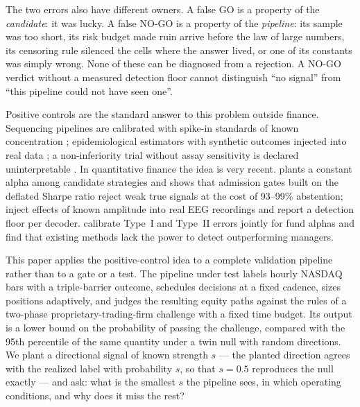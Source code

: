 \documentclass[11pt]{article}
\begin{document}
The two errors also have different owners. A false GO is a property of the \emph{candidate}: it was lucky. A false NO-GO is a property of the \emph{pipeline}: its sample was too short, its risk budget made ruin arrive before the law of large numbers, its censoring rule silenced the cells where the answer lived, or one of its constants was simply wrong. None of these can be diagnosed from a rejection. A NO-GO verdict without a measured detection floor cannot distinguish ``no signal'' from ``this pipeline could not have seen one''.

Positive controls are the standard answer to this problem outside finance. Sequencing pipelines are calibrated with spike-in standards of known concentration \citep{jiang2011}; epidemiological estimators with synthetic outcomes injected into real data \citep{schuemie2018}; a non-inferiority trial without assay sensitivity is declared uninterpretable \citep{temple2000}. In quantitative finance the idea is very recent. \citet{zheng2026} plants a constant alpha among candidate strategies and shows that admission gates built on the deflated Sharpe ratio reject weak true signals at the cost of 93--99\% abstention; \citet{adeika2026} inject effects of known amplitude into real EEG recordings and report a detection floor per decoder. \citet{harvey2020a} calibrate Type~I and Type~II errors jointly for fund alphas and find that existing methods lack the power to detect outperforming managers.

This paper applies the positive-control idea to a complete validation pipeline rather than to a gate or a test. The pipeline under test labels hourly NASDAQ bars with a triple-barrier outcome, schedules decisions at a fixed cadence, sizes positions adaptively, and judges the resulting equity paths against the rules of a two-phase proprietary-trading-firm challenge with a fixed time budget. Its output is a lower bound on the probability of passing the challenge, compared with the 95th percentile of the same quantity under a twin null with random directions. We plant a directional signal of known strength $s$ --- the planted direction agrees with the realized label with probability $s$, so that $s=0.5$ reproduces the null exactly --- and ask: what is the smallest $s$ the pipeline sees, in which operating conditions, and why does it miss the rest?
\end{document}
